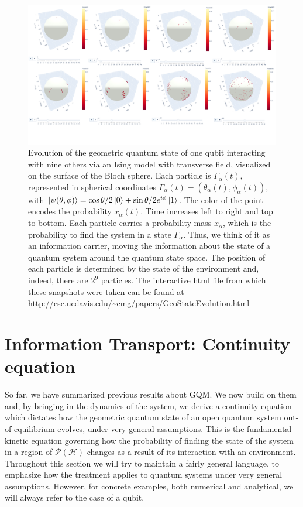 \documentclass[draft,nofootinbib,pre,twocolumn,showpacs,showkeys,preprintnumbers,floatfix]{revtex4-1}
\newcommand{\1}{\mathbbm{1}}
\newcommand{\PH}{\mathcal{P}(\mathcal{H})}
\begin{document}
\begin{figure}[t!]
\centering
\includegraphics[width=.9\textwidth]{./img/DynamicsLong.pdf}
\caption{Evolution of the geometric quantum state of one qubit interacting with 
	nine others via an Ising model with transverse field, visualized on the surface of the Bloch
	sphere. Each particle is $\Gamma_\alpha(t)$, represented in spherical coordinates 
	$\Gamma_\alpha(t) = \left( \theta_\alpha(t),\phi_\alpha(t)\right)$, with $\ket{\psi(\theta,\phi)} = 
	\cos \theta/2 \ket{0}+ \sin \theta/2 e^{i\phi}\ket{1}$. The color of the point encodes the 
	probability $x_\alpha(t)$. Time increases left to right and top to bottom. Each particle
	carries a probability mass $x_\alpha$, which is the probability to find the system in a 
	state $\Gamma_\alpha$. Thus, we think of it as an information carrier, moving the 
	information about the state of a quantum system around the quantum state space.
	The position of each particle is determined by the state of the environment and, indeed, 
	there are $2^9$ particles. The interactive html file from which these snapshots were
	taken can be found at \url{http://csc.ucdavis.edu/~cmg/papers/GeoStateEvolution.html}
	}
\label{fig:gqs_dynamics}
\end{figure}


\section{Information Transport: Continuity equation}
\label{sec:IT}

So far, we have summarized previous results about GQM. We now build on them 
and, by bringing in the dynamics of the system, we derive 
a continuity equation which dictates how the geometric quantum state of an open
quantum system out-of-equilibrium evolves, under very general assumptions. This is 
the fundamental kinetic equation governing how the probability of finding the state 
of the system in a region of $\PH$ changes as a result of its interaction with an environment. 
Throughout this section we will try to maintain a fairly general language, to emphasize
how the treatment applies to quantum systems under very general assumptions. However, 
for concrete examples, both numerical and analytical, we will always refer to the case of a qubit.
\end{document}
